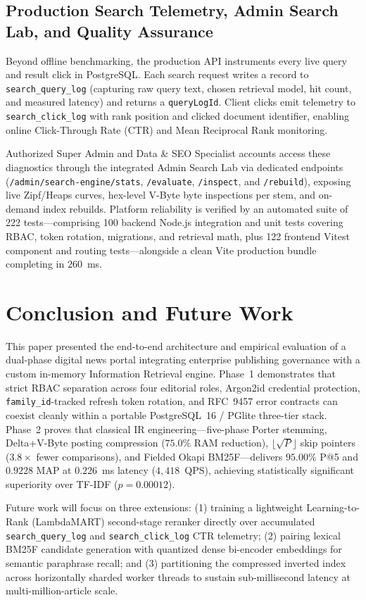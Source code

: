 \subsection{Production Search Telemetry, Admin Search Lab, and Quality Assurance}
Beyond offline benchmarking, the production API instruments every live query and result click in PostgreSQL. Each search request writes a record to \texttt{search\_query\_log} (capturing raw query text, chosen retrieval model, hit count, and measured latency) and returns a \texttt{queryLogId}. Client clicks emit telemetry to \texttt{search\_click\_log} with rank position and clicked document identifier, enabling online Click-Through Rate (CTR) and Mean Reciprocal Rank monitoring.

Authorized Super Admin and Data \& SEO Specialist accounts access these diagnostics through the integrated Admin Search Lab via dedicated endpoints (\texttt{/admin/search-engine/stats}, \texttt{/evaluate}, \texttt{/inspect}, and \texttt{/rebuild}), exposing live Zipf/Heaps curves, hex-level V-Byte byte inspections per stem, and on-demand index rebuilds. Platform reliability is verified by an automated suite of 222 tests—comprising 100 backend Node.js integration and unit tests covering RBAC, token rotation, migrations, and retrieval math, plus 122 frontend Vitest component and routing tests—alongside a clean Vite production bundle completing in $260$~ms.

\section{Conclusion and Future Work}
This paper presented the end-to-end architecture and empirical evaluation of a dual-phase digital news portal integrating enterprise publishing governance with a custom in-memory Information Retrieval engine. Phase~1 demonstrates that strict RBAC separation across four editorial roles, Argon2id credential protection, \texttt{family\_id}-tracked refresh token rotation, and RFC~9457 error contracts can coexist cleanly within a portable PostgreSQL~16 / PGlite three-tier stack. Phase~2 proves that classical IR engineering—five-phase Porter stemming, Delta+V-Byte posting compression ($75.0\%$ RAM reduction), $\lfloor\sqrt{P}\rfloor$ skip pointers ($3.8\times$ fewer comparisons), and Fielded Okapi BM25F—delivers $95.00\%$ P@5 and $0.9228$ MAP at $0.226$~ms latency ($4{,}418$~QPS), achieving statistically significant superiority over TF-IDF ($p = 0.00012$).

Future work will focus on three extensions: (1) training a lightweight Learning-to-Rank (LambdaMART) second-stage reranker directly over accumulated \texttt{search\_query\_log} and \texttt{search\_click\_log} CTR telemetry; (2) pairing lexical BM25F candidate generation with quantized dense bi-encoder embeddings for semantic paraphrase recall; and (3) partitioning the compressed inverted index across horizontally sharded worker threads to sustain sub-millisecond latency at multi-million-article scale.

